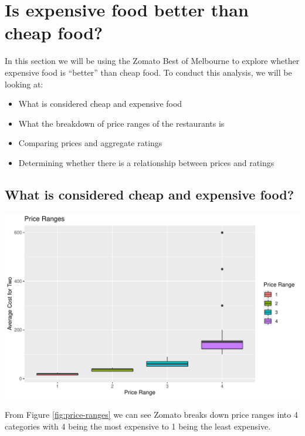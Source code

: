 \documentclass[11pt,a4paper,]{article}
\providecommand{\tightlist}{%
  \setlength{\itemsep}{0pt}\setlength{\parskip}{0pt}}
\let\origfigure\figure
\let\endorigfigure\endfigure
\renewenvironment{figure}[1][2] {
    \expandafter\origfigure\expandafter[H]
} {
    \endorigfigure
}%
\begin{document}
\hypertarget{is-expensive-food-better-than-cheap-food}{%
\section{Is expensive food better than cheap food?}\label{is-expensive-food-better-than-cheap-food}}

In this section we will be using the Zomato Best of Melbourne to explore whether expensive food is ``better'' than cheap food. To conduct this analysis, we will be looking at:

\begin{itemize}
\tightlist
\item
  What is considered cheap and expensive food
\item
  What the breakdown of price ranges of the restaurants is
\item
  Comparing prices and aggregate ratings
\item
  Determining whether there is a relationship between prices and ratings
\end{itemize}

\hypertarget{what-is-considered-cheap-and-expensive-food}{%
\subsection{What is considered cheap and expensive food?}\label{what-is-considered-cheap-and-expensive-food}}

\begin{figure}
\centering
\includegraphics{assignment4_files/figure-latex/price-ranges-1.pdf}
\caption{\label{fig:price-ranges}Price Ranges}
\end{figure}

From Figure \ref{fig:price-ranges} we can see Zomato breaks down price ranges into 4 categories with 4 being the most expensive to 1 being the least expensive.
\end{document}
